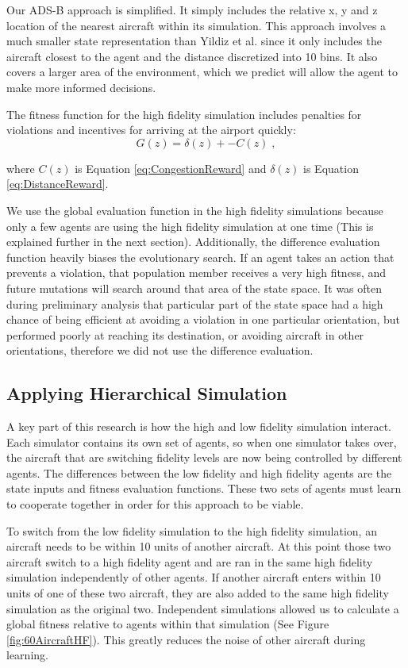 \documentclass{sig-alternate}
\begin{document}
Our ADS-B approach is simplified. It simply includes the relative x, y and z location of the nearest aircraft within its simulation. This approach involves a much smaller state representation than Yildiz et al. since it only includes the aircraft closest to the agent and the distance discretized into 10 bins. It also covers a larger area of the environment, which we predict will allow the agent to make more informed decisions.

The fitness function for the high fidelity simulation includes penalties for violations and incentives for arriving at the airport quickly:
%
\begin{equation} \label{eq:Global-HighFid}
G(z) = \delta(z) + -C(z)\;,
\end{equation}

where $C(z)$ is Equation \ref{eq:CongestionReward} and $\delta(z)$ is Equation \ref{eq:DistanceReward}.

We use the global evaluation function in the high fidelity simulations because only a few agents are using the high fidelity simulation at one time (This is explained further in the next section). Additionally, the difference evaluation function heavily biases the evolutionary search. If an agent takes an action that prevents a violation, that population member receives a very high fitness, and future mutations will search around that area of the state space. It was often during preliminary analysis that particular part of the state space had a high chance of being efficient at avoiding a violation in one particular orientation, but performed poorly at reaching its destination, or avoiding aircraft in other orientations, therefore we did not use the difference evaluation.

\subsection{Applying Hierarchical Simulation}
A key part of this research is how the high and low fidelity simulation interact. Each simulator contains its own set of agents, so when one simulator takes over, the aircraft that are switching fidelity levels are now being controlled by different agents. The differences between the low fidelity and high fidelity agents are the state inputs and fitness evaluation functions. These two sets of agents must learn to cooperate together in order for this approach to be viable. 

To switch from the low fidelity simulation to the high fidelity simulation, an aircraft needs to be within 10 units of another aircraft. At this point those two aircraft switch to a high fidelity agent and are ran in the same high fidelity simulation independently of other agents. If another aircraft enters within 10 units of one of these two aircraft, they are also added to the same high fidelity simulation as the original two. Independent simulations allowed us to calculate a global fitness relative to agents within that simulation (See Figure \ref{fig:60AircraftHF}). This greatly reduces the noise of other aircraft during learning.
\end{document}
